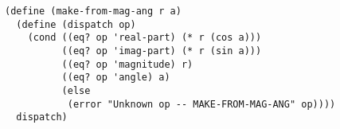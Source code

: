 \documentclass[a4paper,12pt]{article}
\begin{document}
\begin{lstlisting}
(define (make-from-mag-ang r a)
  (define (dispatch op)
    (cond ((eq? op 'real-part) (* r (cos a)))
          ((eq? op 'imag-part) (* r (sin a)))
          ((eq? op 'magnitude) r)
          ((eq? op 'angle) a)
          (else
           (error "Unknown op -- MAKE-FROM-MAG-ANG" op))))
  dispatch)
\end{lstlisting}
\end{document}
